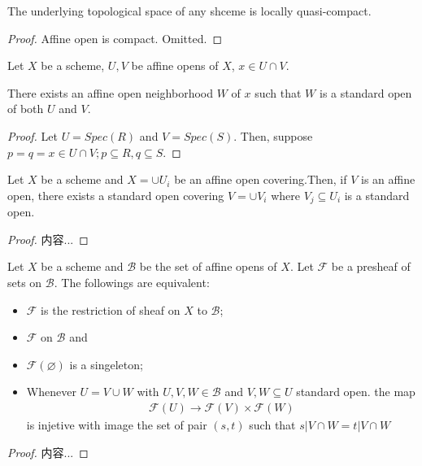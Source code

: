 \documentclass[Total.tex]{subfiles}
\begin{document}
			\begin{lemma}
				The underlying topological space of any shceme is locally quasi-compact.
			\end{lemma}
			\begin{proof}
				Affine open is compact. Omitted.
			\end{proof}
			\begin{lemma}
				Let $X$ be a scheme, $U,V$ be affine opens of $X$, $x\in U\cap V$.
				
				There exists an affine open neighborhood $W$ of $x$ such that $W$ is a standard open of both $U$ and $V$.
			\end{lemma}
			\begin{proof}
				Let $U=Spec(R)$ and $V=Spec(S)$. Then, suppose $p=q=x\in U\cap V;p\subseteq R,q\subseteq S$. 
			\end{proof}
			\begin{lemma}
				Let $X$ be a scheme and $X=\cup U_i$ be an affine open covering.Then, if $V$ is an affine open, there exists a standard open covering $V=\cup V_i$ where $V_j\subseteq U_i$ is a standard open.
			\end{lemma}
			\begin{proof}
				内容...
			\end{proof}
			\begin{lemma}
				Let $X$ be a scheme and $\mathcal{B}$ be the set of affine opens of $X$. Let $\mathcal{F}$ be a presheaf of sets on $\mathcal{B}$. The followings are equivalent:
				\begin{itemize}
					\item $\mathcal{F}$ is the restriction of sheaf on $X$ to $\mathcal{B}$;
					\item $\mathcal{F}$ on $\mathcal{B}$ and
					\item $\mathcal{F}(\varnothing)$ is a singeleton;
					\item Whenever $U=V\cup W$ with $U,V,W\in \mathcal{B}$ and $V,W\subseteq U$ standard open. the map 
					\begin{gather*}
						\mathcal{F}(U)\rightarrow \mathcal{F}(V)\times \mathcal{F}(W)
					\end{gather*} 
					is injetive with image the set of pair $(s,t)$ such that $s|V\cap W=t|V\cap W$ 
				\end{itemize}
			\end{lemma}
			\begin{proof}
				内容...
			\end{proof}
			
\end{document}
